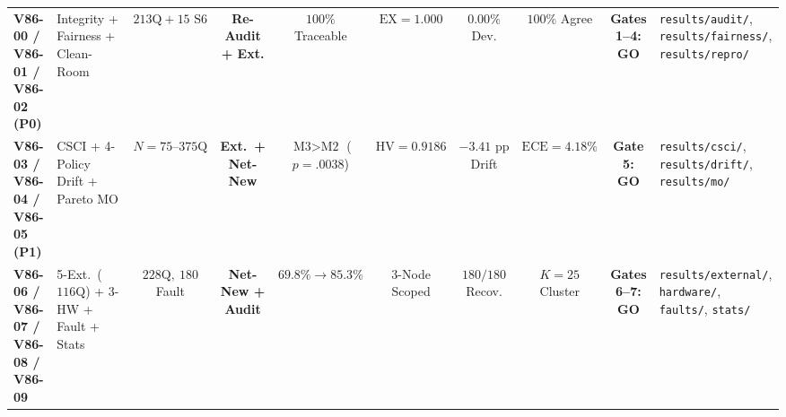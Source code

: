 \documentclass[10pt,a4paper]{article}
\newenvironment{fitasttable}{%
  \begin{lrbox}{\asttblbox}%
}{%
  \end{lrbox}%
  \sbox{\asttblboxB}{%
    \ifdim\wd\asttblbox>0.96\textwidth
      \resizebox{0.96\textwidth}{!}{\usebox{\asttblbox}}%
    \else
      \usebox{\asttblbox}%
    \fi
  }%
  \ifdim\ht\asttblboxB>0.78\textheight
    \resizebox{!}{0.78\textheight}{\usebox{\asttblboxB}}%
  \else
    \usebox{\asttblboxB}%
  \fi
}
\begin{document}
\begin{table}[!htbp]
\begin{fitasttable}
\begin{tabular}{@{}llcccccccl@{}}
\textbf{V86-00 / V86-01 / V86-02 (P0)} & Integrity + Fairness + Clean-Room & $213\text{Q}+15\text{ S6}$ & \textbf{Re-Audit + Ext.} & $100\%$ Traceable & $\text{EX}=1.000$ & $0.00\%$ Dev. & $100\%$ Agree & \textbf{Gates 1--4: GO} & \texttt{results/audit/}, \texttt{results/fairness/}, \texttt{results/repro/} \\
\textbf{V86-03 / V86-04 / V86-05 (P1)} & CSCI + 4-Policy Drift + Pareto MO & $N=75\text{--}375\text{Q}$ & \textbf{Ext.\ + Net-New} & $\text{M3}>\text{M2}$ ($p=.0038$) & $\text{HV}=0.9186$ & $-3.41\text{ pp}$ Drift & $\text{ECE}=4.18\%$ & \textbf{Gate 5: GO} & \texttt{results/csci/}, \texttt{results/drift/}, \texttt{results/mo/} \\
\textbf{V86-06 / V86-07 / V86-08 / V86-09} & 5-Ext.\ ($116\text{Q}$) + 3-HW + Fault + Stats & $228\text{Q},\ 180$ Fault & \textbf{Net-New + Audit} & $69.8\%\rightarrow 85.3\%$ & 3-Node Scoped & $180/180$ Recov. & $K=25$ Cluster & \textbf{Gates 6--7: GO} & \texttt{results/external/}, \texttt{hardware/}, \texttt{faults/}, \texttt{stats/} \\
\bottomrule
\end{tabular}
\end{fitasttable}%
\end{table}
\end{document}
